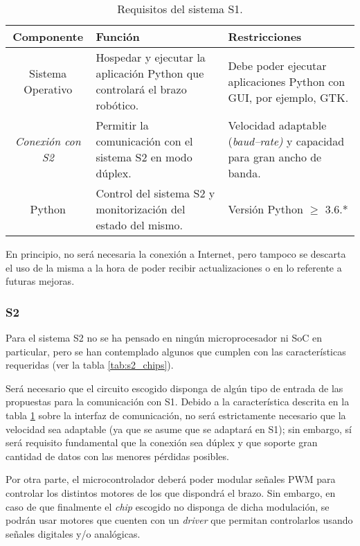 \begin{table}[H]
    \centering
    \begin{tabularx}{\textwidth}{| c | X | X |}
        \hline
        \textbf{Componente} & \textbf{Función} & \textbf{Restricciones} \\
        \hline\hline
        Sistema Operativo & Hospedar y ejecutar la aplicación Python que controlará el brazo robótico. & Debe poder ejecutar aplicaciones Python con \ac{GUI}, por ejemplo, \ac{GTK}. \\
        \hline
        \textit{Conexión con \ac{S2}} & Permitir la comunicación con el sistema \ac{S2} en modo dúplex. & Velocidad adaptable (\textit{baud--rate)} y capacidad para gran ancho de banda. \\
        \hline
        Python & Control del sistema \ac{S2} y monitorización del estado del mismo. & Versión Python $\geqslant$ 3.6.* \\
        \hline
    \end{tabularx}
    \caption{Requisitos del sistema \ac{S1}.}
    \label{tab:s1_requirements}
\end{table}

En principio, no será necesaria la conexión a Internet, pero tampoco se descarta el uso de la misma a la hora de poder recibir actualizaciones o en lo referente a futuras mejoras.

\subsubsection*{\ac{S2}}
Para el sistema \ac{S2} no se ha pensado en ningún microprocesador ni \ac{SoC} en particular, pero se han contemplado algunos que cumplen con las características requeridas (ver la tabla \ref{tab:s2_chips}).

Será necesario que el circuito escogido disponga de algún tipo de entrada de las propuestas para la comunicación con \ac{S1}. Debido a la característica descrita en la tabla \ref{tab:s1_requirements} sobre la interfaz de comunicación, no será estrictamente necesario que la velocidad sea adaptable (ya que se asume que se adaptará en \ac{S1}); sin embargo, sí será requisito fundamental que la conexión sea dúplex y que soporte gran cantidad de datos con las menores pérdidas posibles.

Por otra parte, el microcontrolador deberá poder modular señales \ac{PWM} para controlar los distintos motores de los que dispondrá el brazo. Sin embargo, en caso de que finalmente el \textit{chip} escogido no disponga de dicha modulación, se podrán usar motores que cuenten con un \textit{driver} que permitan controlarlos usando señales digitales y/o analógicas.

